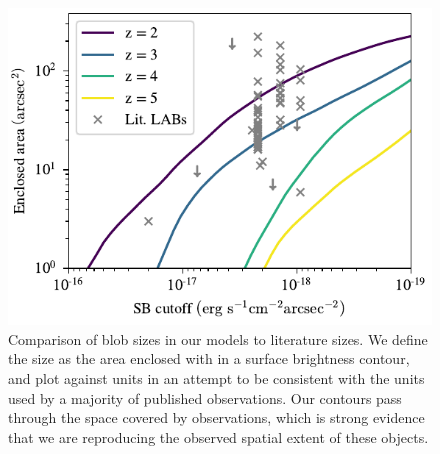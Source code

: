 \begin{figure}
    \centering
    \includegraphics[width=\textwidth,height=\textheight,keepaspectratio]{figures/area_profile.pdf}
    \caption{
        Comparison of blob sizes in our models to literature sizes.
        We define the size as the area enclosed with in a surface brightness contour, and plot against units in an attempt to be consistent with the units used by a majority of published observations.
        Our contours pass through the space covered by observations, which is strong evidence that we are reproducing the observed spatial extent of these objects.
    }
  \label{fig:area_plot}
\end{figure}

